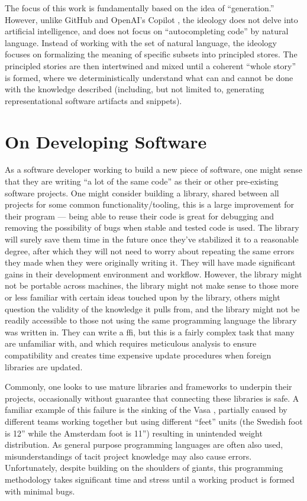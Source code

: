 The focus of this work is fundamentally based on the idea of ``generation.''
However, unlike GitHub and OpenAI's Copilot , the ideology does not
delve into artificial intelligence, and does not focus on ``autocompleting
code'' by natural language. Instead of working with the set of natural language,
the ideology focuses on formalizing the meaning of specific subsets into
principled stores. The principled stories are then intertwined and mixed until a
coherent ``whole story'' is formed, where we deterministically understand what
can and cannot be done with the knowledge described (including, but not limited
to, generating representational software artifacts and snippets).

\section{On Developing Software}
\label{sec:idlgy:on_developing_software}

As a software developer working to build a new piece of software, one might
sense that they are writing ``a lot of the same code'' as their or other
pre-existing software projects. One might consider building a library, shared
between all projects for some common functionality/tooling, this is a large
improvement for their program --- being able to reuse their code is great for
debugging and removing the possibility of bugs when stable and tested code is
used. The library will surely save them time in the future once they've
stabilized it to a reasonable degree, after which they will not need to worry
about repeating the same errors they made when they were originally writing it.
They will have made significant gains in their development environment and
workflow. However, the library might not be portable across machines, the
library might not make sense to those more or less familiar with certain ideas
touched upon by the library, others might question the validity of the knowledge
it pulls from, and the library might not be readily accessible to those not
using the same programming language the library was written in. They can write a
\acs{ffi}, but this is a fairly complex task that many are unfamiliar with, and
which requires meticulous analysis to ensure compatibility and creates time
expensive update procedures when foreign libraries are updated.

Commonly, one looks to use mature libraries and frameworks to underpin their
projects, occasionally without guarantee that connecting these libraries is
safe. A familiar example of this failure is the sinking of the Vasa
\cite{wiki:Vasa_ship}, partially caused by different teams working together but
using different ``feet'' units (the Swedish foot is 12'' while the Amsterdam
foot is 11'') resulting in unintended weight distribution. As general purpose
programming languages are often also used, misunderstandings of tacit project
knowledge may also cause errors. Unfortunately, despite building on the
shoulders of giants, this programming methodology takes significant time and
stress until a working product is formed with minimal bugs.

